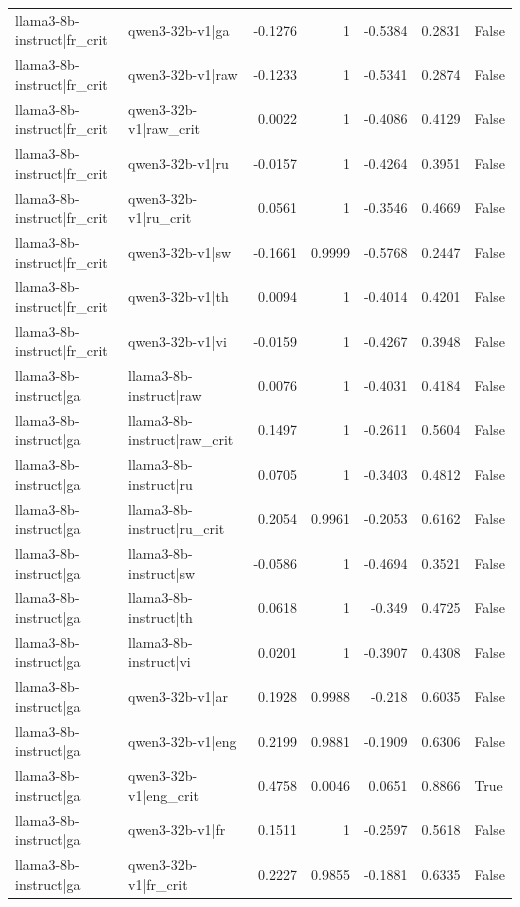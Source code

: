 \begin{table}
\begin{tabular}{l l r r r r l}
llama3-8b-instruct|fr_crit & qwen3-32b-v1|ga & -0.1276 & 1 & -0.5384 & 0.2831 & False \\
llama3-8b-instruct|fr_crit & qwen3-32b-v1|raw & -0.1233 & 1 & -0.5341 & 0.2874 & False \\
llama3-8b-instruct|fr_crit & qwen3-32b-v1|raw_crit & 0.0022 & 1 & -0.4086 & 0.4129 & False \\
llama3-8b-instruct|fr_crit & qwen3-32b-v1|ru & -0.0157 & 1 & -0.4264 & 0.3951 & False \\
llama3-8b-instruct|fr_crit & qwen3-32b-v1|ru_crit & 0.0561 & 1 & -0.3546 & 0.4669 & False \\
llama3-8b-instruct|fr_crit & qwen3-32b-v1|sw & -0.1661 & 0.9999 & -0.5768 & 0.2447 & False \\
llama3-8b-instruct|fr_crit & qwen3-32b-v1|th & 0.0094 & 1 & -0.4014 & 0.4201 & False \\
llama3-8b-instruct|fr_crit & qwen3-32b-v1|vi & -0.0159 & 1 & -0.4267 & 0.3948 & False \\
llama3-8b-instruct|ga & llama3-8b-instruct|raw & 0.0076 & 1 & -0.4031 & 0.4184 & False \\
llama3-8b-instruct|ga & llama3-8b-instruct|raw_crit & 0.1497 & 1 & -0.2611 & 0.5604 & False \\
llama3-8b-instruct|ga & llama3-8b-instruct|ru & 0.0705 & 1 & -0.3403 & 0.4812 & False \\
llama3-8b-instruct|ga & llama3-8b-instruct|ru_crit & 0.2054 & 0.9961 & -0.2053 & 0.6162 & False \\
llama3-8b-instruct|ga & llama3-8b-instruct|sw & -0.0586 & 1 & -0.4694 & 0.3521 & False \\
llama3-8b-instruct|ga & llama3-8b-instruct|th & 0.0618 & 1 & -0.349 & 0.4725 & False \\
llama3-8b-instruct|ga & llama3-8b-instruct|vi & 0.0201 & 1 & -0.3907 & 0.4308 & False \\
llama3-8b-instruct|ga & qwen3-32b-v1|ar & 0.1928 & 0.9988 & -0.218 & 0.6035 & False \\
llama3-8b-instruct|ga & qwen3-32b-v1|eng & 0.2199 & 0.9881 & -0.1909 & 0.6306 & False \\
llama3-8b-instruct|ga & qwen3-32b-v1|eng_crit & 0.4758 & 0.0046 & 0.0651 & 0.8866 & True \\
llama3-8b-instruct|ga & qwen3-32b-v1|fr & 0.1511 & 1 & -0.2597 & 0.5618 & False \\
llama3-8b-instruct|ga & qwen3-32b-v1|fr_crit & 0.2227 & 0.9855 & -0.1881 & 0.6335 & False \\

\end{tabular}
\end{table}
